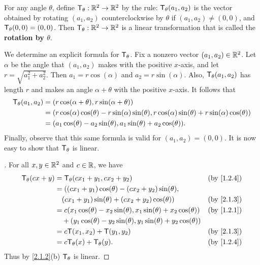 \begin{eg}\label{2.1.3}
	For any angle \(\theta\), define \(\mathsf{T}_{\theta} : \mathbb{R}^2 \to \mathbb{R}^2\) by the rule: \(\mathsf{T}_{\theta}(a_1, a_2)\) is the vector obtained by rotating \((a_1, a_2)\) counterclockwise by \(\theta\) if \((a_1, a_2) \neq (0, 0)\), and \(\mathsf{T}_{\theta}(0, 0) = (0, 0)\).
	Then \(\mathsf{T}_{\theta} : \mathbb{R}^2 \to \mathbb{R}^2\) is a linear transformation that is called the \textbf{rotation by \(\theta\)}.

	We determine an explicit formula for \(\mathsf{T}_{\theta}\).
	Fix a nonzero vector \((a_1, a_2) \in \mathbb{R}^2\).
	Let \(\alpha\) be the angle that \((a_1, a_2)\) makes with the positive \(x\)-axis, and let \(r = \sqrt{a_1^2 +a_2^2}\).
	Then \(a_1 = r \cos(\alpha)\) and \(a_2 = r \sin(\alpha)\).
	Also, \(\mathsf{T}_{\theta}(a_1, a_2)\) has length \(r\) and makes an angle \(\alpha + \theta\) with the positive \(x\)-axis.
	It follows that
	\begin{align*}
		\mathsf{T}_{\theta}(a_1, a_2) & = (r \cos(\alpha + \theta), r \sin(\alpha + \theta))                                                                     \\
		                      & = (r \cos(\alpha) \cos(\theta) - r \sin(\alpha) \sin(\theta), r \cos(\alpha) \sin(\theta) + r \sin(\alpha) \cos(\theta)) \\
		                      & = (a_1 \cos(\theta) - a_2 \sin(\theta), a_1 \sin(\theta) + a_2 \cos(\theta)).
	\end{align*}
	Finally, observe that this same formula is valid for \((a_1 ,a_2) = (0, 0)\).
	It is now easy to show that \(\mathsf{T}_{\theta}\) is linear.
\end{eg}

\begin{proof}[]
	For all \(x, y \in \mathbb{R}^2\) and \(c \in \mathbb{R}\), we have
	\begin{align*}
		\T_{\theta}(cx + y) & = \T_{\theta}(cx_1 + y_1, cx_2 + y_2)                                              &  & \by{1.2.4} \\
		                    & = ((cx_1 + y_1) \cos(\theta) - (cx_2 + y_2)\sin(\theta),                                           \\
		                    & \quad (cx_1 + y_1) \sin(\theta) + (cx_2 + y_2) \cos(\theta))                       &  & \by{2.1.3} \\
		                    & = c (x_1 \cos(\theta) - x_2 \sin(\theta), x_1 \sin(\theta) + x_2 \cos(\theta))     &  & \by{1.2.1} \\
		                    & \quad + (y_1 \cos(\theta) - y_2 \sin(\theta), y_1 \sin(\theta) + y_2 \cos(\theta))                 \\
		                    & = c\T(x_1, x_2) + \T(y_1, y_2)                                                     &  & \by{2.1.3} \\
		                    & = c\T_{\theta}(x) + \T_{\theta}(y).                                                &  & \by{1.2.4}
	\end{align*}
	Thus by \cref{2.1.2}(b) \(\mathsf{T}_{\theta}\) is linear.
\end{proof}

